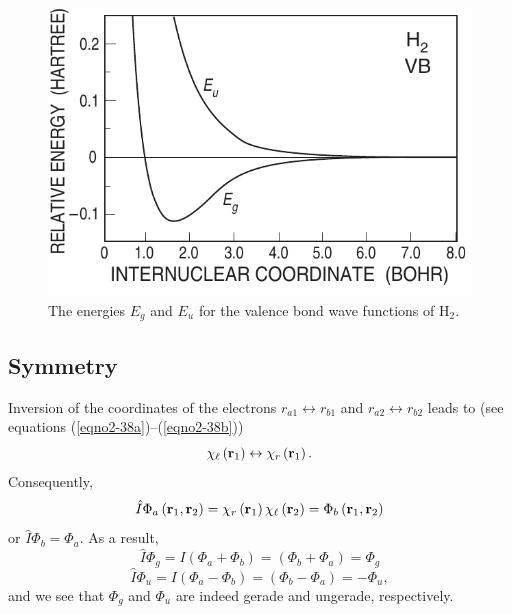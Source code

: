 \begin{figure}
\includegraphics[scale=0.75]{fig2-26}
\caption{The energies $E_g$ and $E_u$ for the valence bond wave
  functions of H$_2$.}
\label{fig2-26}
\end{figure}

\subsection{Symmetry}
    
Inversion of the coordinates of the electrons $r_{a1} \leftrightarrow
r_{b1}$ and $r_{a2} \leftrightarrow r_{b2}$ leads to (see equations
(\ref{eqno2-38a})--(\ref{eqno2-38b}))
\begin{equation}
\chi_\ell \left( {\bf r}_1 \right) \leftrightarrow \chi_r \left( {\bf 
r}_1 \right).
\end{equation}
Consequently,
\begin{equation}
{\hat{I}} \Phi_a \left( {\bf r}_1, {\bf r}_2 \right) = \chi_r 
\left( {\bf r}_1 \right) \chi_\ell \left( {\bf r}_2 \right) = \Phi_b 
\left( {\bf r}_1 , {\bf r}_2 \right)
\end{equation}
or ${\hat{I}} \Phi_b = \Phi_a$.  As a result,
\begin{equation}
{\hat{I}} \Phi_g = I \left( \Phi_a + \Phi_b \right) = \left( \Phi_b + 
\Phi_a \right) = \Phi_g
\end{equation}
\begin{equation}
{\hat{I}} \Phi_u = I \left( \Phi_a - \Phi_b \right) = \left( \Phi_b - 
\Phi_a \right) = - \Phi_u ,
\end{equation}
and we see that $\Phi_g$ and $\Phi_u$ are indeed gerade and ungerade, 
respectively.

